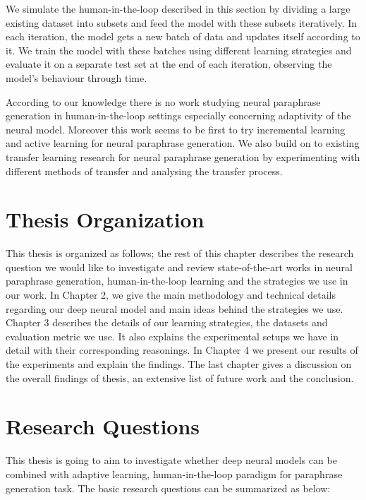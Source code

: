 We simulate the human-in-the-loop described in this section by dividing a large existing dataset into subsets and feed the model with these subsets iteratively. In each iteration, the model gets a new batch of data and updates itself according to it. We train the model with these batches using different learning strategies and evaluate it on a separate test set at the end of each iteration, observing the model's behaviour through time.

According to our knowledge there is no work studying neural paraphrase generation in human-in-the-loop settings especially concerning adaptivity of the neural model. Moreover this work seems to be first to try incremental learning and active learning for neural paraphrase generation. We also build on to existing transfer learning research for neural paraphrase generation by experimenting with different methods of transfer and analysing the transfer process.

\section{Thesis Organization}
This thesis is organized as follows; the rest of this chapter describes the research question we would like to investigate and review state-of-the-art works in neural paraphrase generation, human-in-the-loop learning and the strategies we use in our work. In Chapter 2, we give the main methodology and technical details regarding our deep neural model and main ideas behind the strategies we use. Chapter 3 describes the details of our learning strategies, the datasets and evaluation metric we use. It also explains the experimental setups we have in detail with their corresponding reasonings. In Chapter 4 we present our results of the experiments and explain the findings. The last chapter gives a discussion on the overall findings of thesis, an extensive list of future work and the conclusion.

\section{Research Questions}

This thesis is going to aim to investigate whether deep neural models can be combined with adaptive learning, human-in-the-loop paradigm for paraphrase generation task. The basic research questions can be summarized as below:

